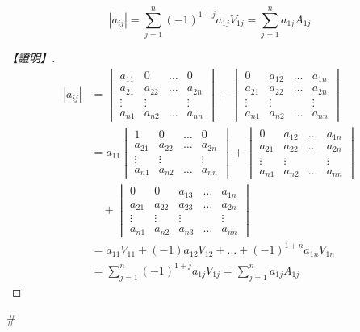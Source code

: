 \begin{theorem}\label{thm:b6-1-15}
\[ |a_{ij}| = \sum_{j=1}^n (-1)^{1+j} a_{1j} V_{1j} = \sum_{j=1}^n a_{1j} A_{1j} \]
\end{theorem}

\begin{proof}[【證明】]
\begin{align*}
|a_{ij}| &= \begin{vmatrix}
a_{11} & 0 & \dots & 0 \\
a_{21} & a_{22} & \dots & a_{2n} \\
\vdots & \vdots & & \vdots \\
a_{n1} & a_{n2} & \dots & a_{nn}
\end{vmatrix} + \begin{vmatrix}
0 & a_{12} & \dots & a_{1n} \\
a_{21} & a_{22} & \dots & a_{2n} \\
\vdots & \vdots & & \vdots \\
a_{n1} & a_{n2} & \dots & a_{nn}
\end{vmatrix} \\
&= a_{11} \begin{vmatrix}
1 & 0 & \dots & 0 \\
a_{21} & a_{22} & \dots & a_{2n} \\
\vdots & \vdots & & \vdots \\
a_{n1} & a_{n2} & \dots & a_{nn}
\end{vmatrix} + \begin{vmatrix}
0 & a_{12} & \dots & a_{1n} \\
a_{21} & a_{22} & \dots & a_{2n} \\
\vdots & \vdots & & \vdots \\
a_{n1} & a_{n2} & \dots & a_{nn}
\end{vmatrix} \\
&\quad + \begin{vmatrix}
0 & 0 & a_{13} & \dots & a_{1n} \\
a_{21} & a_{22} & a_{23} & \dots & a_{2n} \\
\vdots & \vdots & \vdots & & \vdots \\
a_{n1} & a_{n2} & a_{n3} & \dots & a_{nn}
\end{vmatrix} \\
&= a_{11} V_{11} + (-1) a_{12} V_{12} + \dots + (-1)^{1+n} a_{1n} V_{1n} \\
&= \sum_{j=1}^n (-1)^{1+j} a_{1j} V_{1j} = \sum_{j=1}^n a_{1j} A_{1j}
\end{align*}
\end{proof}\hfill$\#$

